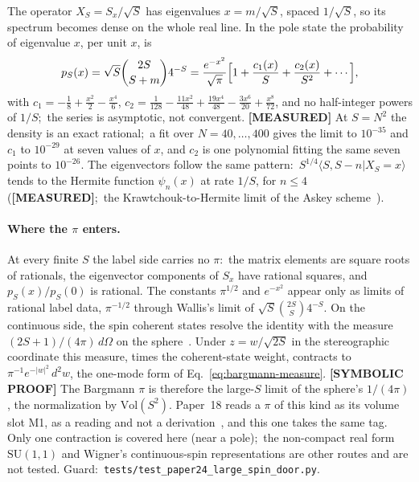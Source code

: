 \documentclass[twocolumn,pra,amsmath,amssymb,superscriptaddress]{revtex4-2}
\begin{document}
The operator $X_S = S_x/\sqrt{S}$ has eigenvalues $x = m/\sqrt{S}$,
spaced $1/\sqrt{S}$, so its spectrum becomes dense on the whole real
line.  In the pole state the probability of eigenvalue $x$, per unit
$x$, is
\begin{equation}
  p_S(x) = \sqrt{S}\binom{2S}{S+m}4^{-S}
  = \frac{e^{-x^2}}{\sqrt{\pi}}
    \Bigl[1 + \frac{c_1(x)}{S} + \frac{c_2(x)}{S^2} + \cdots\Bigr],
  \label{eq:spin_density}
\end{equation}
with $c_1 = -\tfrac18 + \tfrac{x^2}{2} - \tfrac{x^4}{6}$,
$c_2 = \tfrac{1}{128} - \tfrac{11x^2}{48} + \tfrac{19x^4}{48}
- \tfrac{3x^6}{20} + \tfrac{x^8}{72}$, and no half-integer powers of
$1/S$;\ the series is asymptotic, not convergent.
\textbf{[MEASURED]} At $S = N^2$ the density is an exact rational;\ a
fit over $N = 40, \dots, 400$ gives the limit to $10^{-35}$ and $c_1$
to $10^{-29}$ at seven values of $x$, and $c_2$ is one polynomial
fitting the same seven points to $10^{-26}$.  The eigenvectors follow
the same pattern:\ $S^{1/4}\langle S, S-n | X_S = x\rangle$ tends to
the Hermite function $\psi_n(x)$ at rate $1/S$, for $n \le 4$
(\textbf{[MEASURED]};\ the Krawtchouk-to-Hermite limit of the Askey
scheme~\cite{koekoek2010}).

\paragraph{Where the $\pi$ enters.}
At every finite $S$ the label side carries no $\pi$:\ the matrix
elements are square roots of rationals, the eigenvector components of
$S_x$ have rational squares, and $p_S(x)/p_S(0)$ is rational.  The
constants $\pi^{1/2}$ and $e^{-x^2}$ appear only as limits of rational
label data, $\pi^{-1/2}$ through Wallis's limit of $\sqrt{S}\binom{2S}{S}4^{-S}$.
On the continuous side, the spin coherent states resolve the identity
with the measure $(2S+1)/(4\pi)\,d\Omega$ on the
sphere~\cite{radcliffe1971,arecchi1972}.  Under $z = w/\sqrt{2S}$ in the
stereographic coordinate this measure, times the coherent-state weight,
contracts to $\pi^{-1}e^{-|w|^2}\,d^2w$, the one-mode form of
Eq.~\eqref{eq:bargmann-measure}.  \textbf{[SYMBOLIC PROOF]} The
Bargmann $\pi$ is therefore the large-$S$ limit of the sphere's
$1/(4\pi)$, the normalization by $\mathrm{Vol}(S^2)$.  Paper~18 reads a
$\pi$ of this kind as its volume slot M1, as a reading and not a
derivation~\cite{paper18}, and this one takes the same tag.  Only one
contraction is covered here (near a pole);\ the non-compact real form
$\mathrm{SU}(1,1)$ and Wigner's continuous-spin representations are
other routes and are not tested.  Guard:\
\texttt{tests/test\_paper24\_large\_spin\_door.py}.
\end{document}
